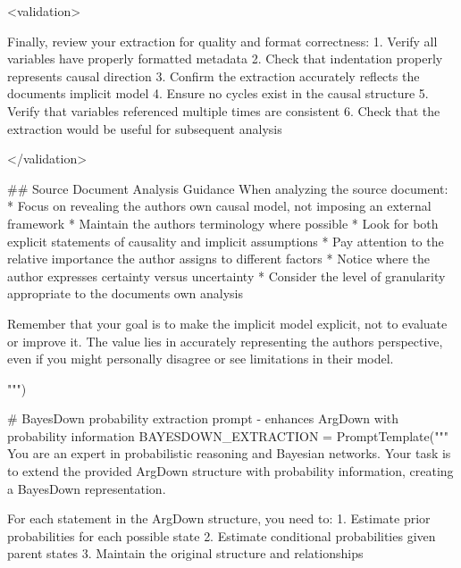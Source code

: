 \documentclass[
  11pt,
  letterpaper,
]{book}
\newenvironment{Shaded}{\begin{snugshade}}{\end{snugshade}}
\newcommand{\CommentTok}[1]{\textcolor[rgb]{0.37,0.37,0.37}{#1}}
\newcommand{\NormalTok}[1]{\textcolor[rgb]{0.00,0.23,0.31}{#1}}
\newcommand{\OperatorTok}[1]{\textcolor[rgb]{0.37,0.37,0.37}{#1}}
\newcommand{\StringTok}[1]{\textcolor[rgb]{0.13,0.47,0.30}{#1}}
\begin{document}
\begin{landscape}
\begin{Shaded}
\begin{Highlighting}[]
\StringTok{\textless{}validation\textgreater{}}

\StringTok{Finally, review your extraction for quality and format correctness:}
\StringTok{1. Verify all variables have properly formatted metadata}
\StringTok{2. Check that indentation properly represents causal direction}
\StringTok{3. Confirm the extraction accurately reflects the document\textquotesingle{}s implicit model}
\StringTok{4. Ensure no cycles exist in the causal structure}
\StringTok{5. Verify that variables referenced multiple times are consistent}
\StringTok{6. Check that the extraction would be useful for subsequent analysis}

\StringTok{\textless{}/validation\textgreater{}}


\StringTok{\#\# Source Document Analysis Guidance}
\StringTok{When analyzing the source document:}
\StringTok{* Focus on revealing the author\textquotesingle{}s own causal model, not imposing an external framework}
\StringTok{* Maintain the author\textquotesingle{}s terminology where possible}
\StringTok{* Look for both explicit statements of causality and implicit assumptions}
\StringTok{* Pay attention to the relative importance the author assigns to different factors}
\StringTok{* Notice where the author expresses certainty versus uncertainty}
\StringTok{* Consider the level of granularity appropriate to the document\textquotesingle{}s own analysis}

\StringTok{Remember that your goal is to make the implicit model explicit, not to evaluate or improve it.}
\StringTok{The value lies in accurately representing the author\textquotesingle{}s perspective, even if you might personally disagree or see limitations in their model.}

\StringTok{"""}\NormalTok{)}

    \CommentTok{\# BayesDown probability extraction prompt {-} enhances ArgDown with probability information}
\NormalTok{    BAYESDOWN\_EXTRACTION }\OperatorTok{=}\NormalTok{ PromptTemplate(}\StringTok{"""}
\StringTok{You are an expert in probabilistic reasoning and Bayesian networks. Your task is}
\StringTok{to extend the provided ArgDown structure with probability information,}
\StringTok{creating a BayesDown representation.}

\StringTok{For each statement in the ArgDown structure, you need to:}
\StringTok{1. Estimate prior probabilities for each possible state}
\StringTok{2. Estimate conditional probabilities given parent states}
\StringTok{3. Maintain the original structure and relationships}


\end{Highlighting}
\end{Shaded}
\end{landscape}
\end{document}
